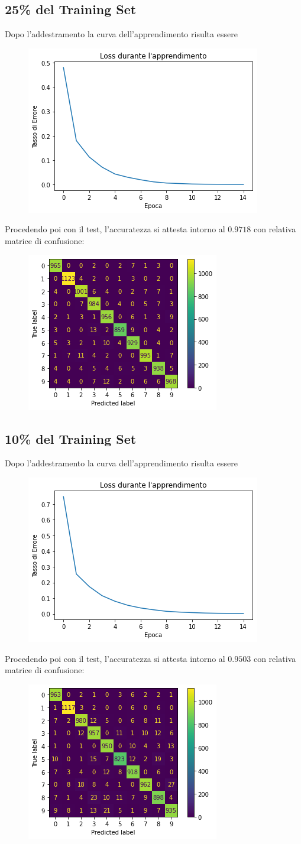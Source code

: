 \documentclass[12pt, a4paper]{article}
\begin{document}
\subsection{25\% del Training Set}
Dopo l'addestramento la curva dell'apprendimento risulta essere
\begin{figure}[H]
    \centering
    \includegraphics[width=.5\textwidth]{Set25.png}
\end{figure}

Procedendo poi con il test, l'accuratezza si attesta intorno al \(0.9718\) con relativa matrice di confusione:
\begin{figure}[H]
    \centering
    \includegraphics[width=.5\textwidth]{Matrix25.png}
\end{figure}

\subsection{10\% del Training Set}
Dopo l'addestramento la curva dell'apprendimento risulta essere
\begin{figure}[H]
    \centering
    \includegraphics[width=.5\textwidth]{Set10.png}
\end{figure}

Procedendo poi con il test, l'accuratezza si attesta intorno al \(0.9503\) con relativa matrice di confusione:
\begin{figure}[H]
    \centering
    \includegraphics[width=.5\textwidth]{Matrix10.png}
\end{figure}
\end{document}
